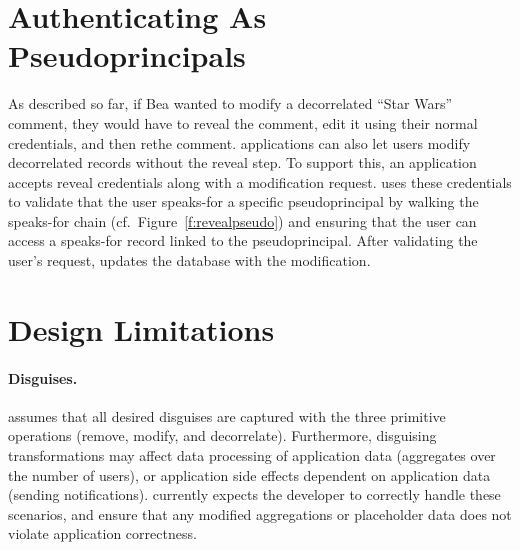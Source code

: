 



\section{Authenticating As Pseudoprincipals}

As described so far, if Bea wanted to modify a decorrelated ``Star Wars''
comment, they would have to reveal the comment, edit it using their normal
credentials, and then re\xx the comment.
%
\sys applications can also let users modify decorrelated records without the
reveal step.
%
To support this, an application accepts reveal credentials along with a
modification request. \sys uses these credentials to validate that the user
speaks-for a specific pseudoprincipal by walking the speaks-for chain (cf.\
Figure~\ref{f:revealpseudo}) and ensuring that the user can access a speaks-for
record linked to the pseudoprincipal. After validating the user's request, \sys updates
the database with the modification.
%
%

\section{Design Limitations}
\label{s:design:limits}

\paragraph{Disguises.}
\sys assumes that all desired disguises are captured with the three primitive
operations (remove, modify, and decorrelate).
%
Furthermore, disguising transformations may affect data processing of
application data (\eg aggregates over the number of users), or application side
effects dependent on application data (\eg sending notifications).  \sys
currently expects the developer to correctly handle these scenarios, and ensure
that any modified aggregations or placeholder data does not violate application
correctness.
%

